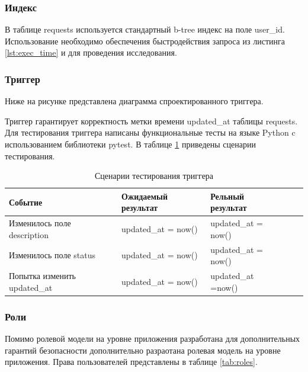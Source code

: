 \subsubsection{Индекс}

В таблице requests используется стандартный b-tree индекс на поле user{\_}id. Использование необходимо обеспечения быстродействия запроса из листинга \ref{lst:exec_time} и для проведения исследования.


\subsubsection{Триггер}

Ниже на рисунке представлена диаграмма спроектированного триггера.

Триггер гарантирует корректность метки времени updated{\_}at таблицы requests. Для тестирования триггера написаны функциональные тесты на языке Python c использованием библиотеки pytest. В таблице \ref{tab:trigger_tests} приведены сценарии тестирования.

\begin{table}[ht!]
	\centering
	\caption{\label{tab:trigger_tests} Сценарии тестирования триггера}
	\begin{tabular}{|l|l|l|l|l|}
		\hline
		\textbf{Событие} & \textbf{Ожидаемый результат} & \textbf{Рельный результат}\\
		\hline
		Изменилось поле description & updated{\_}at = now() & updated{\_}at = now() \\
		\hline
		Изменилось поле status & updated{\_}at = now() & updated{\_}at =  now() \\
		\hline
		Попытка изменить updated{\_}at & updated{\_}at = now() & updated{\_}at =now() \\
\hline
		
	\end{tabular}
\end{table}

\subsubsection{Роли}

Помимо ролевой модели на уровне приложения разработана для дополнительных гарантий безопасности дополнительно разраотана ролевая модель на уровне приложения.  Права пользователей представлены в таблице \ref{tab:roles}.

